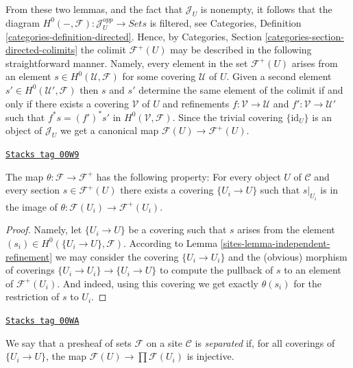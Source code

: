 From these two lemmas, and the fact that $\mathcal{J}_U$ is nonempty,
it follows that the diagram $H^0(-, \mathcal{F}) : \mathcal{J}_U^{opp}
\to \textit{Sets}$ is filtered, see
Categories, Definition \ref{categories-definition-directed}.
Hence, by Categories,
Section \ref{categories-section-directed-colimits}
the colimit $\mathcal{F}^{+}(U)$ may be described
in the following straightforward manner. Namely, every element in the set
$\mathcal{F}^{+}(U)$ arises from an element
$s \in H^0(\mathcal{U}, \mathcal{F})$ for some covering
$\mathcal{U}$ of $U$. Given a second element $s' \in
H^0(\mathcal{U}', \mathcal{F})$ then $s$ and $s'$ determine
the same element of the colimit if and only if there exists a covering
$\mathcal{V}$ of $U$ and refinements $f : \mathcal{V} \to \mathcal{U}$ and
$f' : \mathcal{V} \to \mathcal{U}'$ such that $f^*s = (f')^*s'$
in $H^0(\mathcal{V}, \mathcal{F})$. Since the trivial covering
$\{\text{id}_U\}$ is an object of $\mathcal{J}_U$ we get
a canonical map $\mathcal{F}(U) \to \mathcal{F}^+(U)$.

\begin{lemma}
\label{sites-lemma-plus-surjective}
\href{https://stacks.math.columbia.edu/tag/00W9}{\texttt{Stacks tag 00W9}}

The map $\theta : \mathcal{F} \to \mathcal{F}^+$ has the following
property: For every object $U$ of $\mathcal{C}$ and every section
$s \in \mathcal{F}^+(U)$ there exists a covering $\{U_i \to U\}$
such that $s|_{U_i}$ is in the image of $\theta : \mathcal{F}(U_i)
\to \mathcal{F}^{+}(U_i)$.
\end{lemma}

\begin{proof}

Namely, let $\{U_i \to U\}$ be a covering such that $s$ arises
from the element $(s_i) \in H^0(\{U_i \to U\}, \mathcal{F})$.
According to Lemma \ref{sites-lemma-independent-refinement} we may
consider the covering $\{U_i \to U_i\}$ and the (obvious) morphism
of coverings $\{U_i \to U_i\} \to \{U_i \to U\}$ to compute the
pullback of $s$ to an element of $\mathcal{F}^+(U_i)$. And indeed,
using this covering we get exactly $\theta(s_i)$ for the restriction
of $s$ to $U_i$.
\end{proof}

\begin{definition}[Separated]
\label{sites-definition-separated}
\href{https://stacks.math.columbia.edu/tag/00WA}{\texttt{Stacks tag 00WA}}

We say that a presheaf of sets $\mathcal{F}$ on a site
$\mathcal{C}$ is {\it separated} if, for all coverings
of $\{U_i \rightarrow U\}$, the map
$\mathcal{F}(U) \to \prod \mathcal{F}(U_i)$ is injective.
\end{definition}

